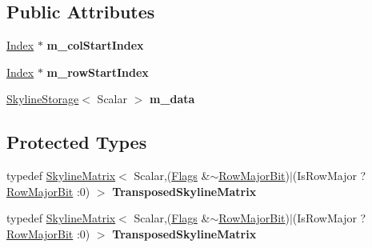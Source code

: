 \subsection*{Public Attributes}
\begin{DoxyCompactItemize}
\item 
\mbox{\label{class_eigen_1_1_skyline_matrix_a3bda79d5b6c3a027304e391d7d01c276}} 
\hyperlink{group___core___module_a554f30542cc2316add4b1ea0a492ff02}{Index} $\ast$ {\bfseries m\+\_\+col\+Start\+Index}
\item 
\mbox{\label{class_eigen_1_1_skyline_matrix_aa1212082b8cb452fd7d991ec520dd904}} 
\hyperlink{group___core___module_a554f30542cc2316add4b1ea0a492ff02}{Index} $\ast$ {\bfseries m\+\_\+row\+Start\+Index}
\item 
\mbox{\label{class_eigen_1_1_skyline_matrix_ad003d34a39ea160868032f25e54e71f7}} 
\hyperlink{class_eigen_1_1_skyline_storage}{Skyline\+Storage}$<$ Scalar $>$ {\bfseries m\+\_\+data}
\end{DoxyCompactItemize}
\subsection*{Protected Types}
\begin{DoxyCompactItemize}
\item 
\mbox{\label{class_eigen_1_1_skyline_matrix_ad24e6b67dae215b0d37f40c35b63e343}} 
typedef \hyperlink{class_eigen_1_1_skyline_matrix}{Skyline\+Matrix}$<$ Scalar,(\hyperlink{class_eigen_1_1_skyline_matrix_base_a811ba3961cb927ae5fa84ed278ebceeaa206a06da6112137d014c4ff4f199f546}{Flags} \&$\sim$\hyperlink{group__flags_gae4f56c2a60bbe4bd2e44c5b19cbe8762}{Row\+Major\+Bit})$\vert$(Is\+Row\+Major ? \hyperlink{group__flags_gae4f56c2a60bbe4bd2e44c5b19cbe8762}{Row\+Major\+Bit} \+:0) $>$ {\bfseries Transposed\+Skyline\+Matrix}
\item 
\mbox{\label{class_eigen_1_1_skyline_matrix_ad24e6b67dae215b0d37f40c35b63e343}} 
typedef \hyperlink{class_eigen_1_1_skyline_matrix}{Skyline\+Matrix}$<$ Scalar,(\hyperlink{class_eigen_1_1_skyline_matrix_base_a811ba3961cb927ae5fa84ed278ebceeaa206a06da6112137d014c4ff4f199f546}{Flags} \&$\sim$\hyperlink{group__flags_gae4f56c2a60bbe4bd2e44c5b19cbe8762}{Row\+Major\+Bit})$\vert$(Is\+Row\+Major ? \hyperlink{group__flags_gae4f56c2a60bbe4bd2e44c5b19cbe8762}{Row\+Major\+Bit} \+:0) $>$ {\bfseries Transposed\+Skyline\+Matrix}
\end{DoxyCompactItemize}
